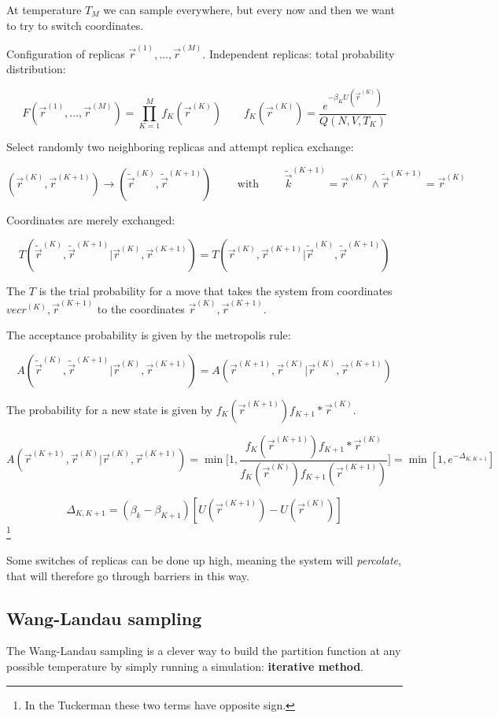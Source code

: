 	At temperature $T_M$ we can sample everywhere, but every now and then we want to try to switch coordinates.
	
	Configuration of replicas $\vec{r}^{(1)}, \dots, \vec{r}^{(M)}$.
	Independent replicas: total probability distribution:

	$$F(\vec{r}^{(1)}, \dots, \vec{r}^{(M)}) = \prod\limits_{K=1}^Mf_K(\vec{r}^{(K)})\qquad f_K(\vec{r}^{(K)}) = \frac{e^{-\beta_K U(\vec{r}^{(K)})}}{Q(N ,V, T_K)}$$

	Select randomly two neighboring replicas and attempt replica exchange:

	$$(\vec{r}^{(K)}, \vec{r}^{(K+1)})\rightarrow (\tilde{\vec{r}}^{(K)}, \tilde{\vec{r}}^{(K+1)})\qquad\text{ with }\qquad \tilde{\vec{k}}^{(K+1)} = \vec{r}^{(K)}\land \tilde{\vec{r}}^{(K+1)}=\vec{r}^{(K)}$$

	Coordinates are merely exchanged:

	$$T(\tilde{\vec{r}}^{(K)}, \tilde{\vec{r}}^{(K+1)}|\vec{r}^{(K)}, \vec{r}^{(K+1)}) = T(\vec{r}^{(K)}, \vec{r}^{(K+1)}|\tilde{\vec{r}}^{(K)}, \tilde{\vec{r}}^{(K+1)})$$
	
	The $T$ is the trial probability for a move that takes the system from coordinates $vec{r}^{(K)}, \vec{r}^{(K+1)}$ to the coordinates $\vec{r}^{(K)}, \vec{r}^{(K+1)}$. 

	The acceptance probability is given by the metropolis rule:

	$$A(\tilde{\vec{r}}^{(K)}, \tilde{\vec{r}}^{(K+1)}|\vec{r}^{(K)}, \vec{r}^{(K+1)}) = A(\vec{r}^{(K+1)}, \vec{r}^{(K)} | \vec{r}^{(K)}, \vec{r}^{(K+1)})$$
	
	The probability for a new state is given by  $f_K(\vec{r}^{(K+1)})f_{K+1}*\vec{r}^{(K)}$. 
	
	$$A(\vec{r}^{(K+1)}, \vec{r}^{(K)} | \vec{r}^{(K)}, \vec{r}^{(K+1)}) = \min\biggl[1, \frac{f_K(\vec{r}^{(K+1)})f_{K+1}*\vec{r}^{(K)}}{f_K(\vec{r}^{(K)})f_{K+1}(\vec{r}^{(K+1)})}\biggr] = \min[1, e^{-\Delta_{K, K+1}}]$$

	$$\Delta_{K, K+1} = (\beta_k-\beta_{K+1})[U(\vec{r}^{(K+1)}) - U(\vec{r}^{(K)})]$$\footnote{In the Tuckerman these two terms have opposite sign.}
	
	Some switches of replicas can be done up high, meaning the system will \textit{percolate}, that will therefore go through barriers in this way.
	
	\subsection{Wang-Landau sampling}
	The Wang-Landau sampling is a clever way to build the partition function at any possible temperature by simply running a simulation: \textbf{iterative method}.

